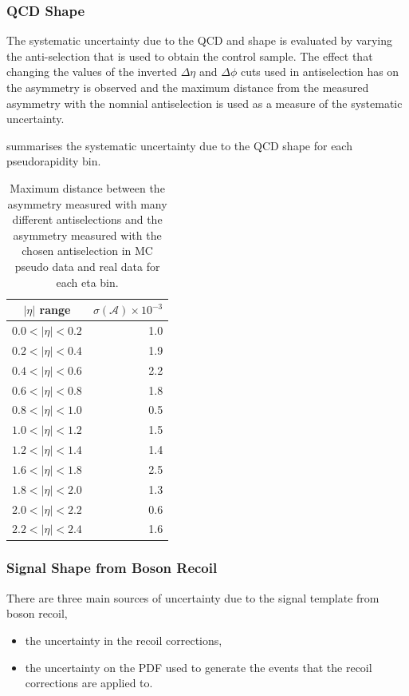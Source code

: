 \subsubsection{QCD \ETm Shape}
The systematic uncertainty due to the \ac{QCD} and \gjet \ETm shape is evaluated
by varying the anti-selection that is used to obtain the control sample. The
effect that changing the values of the inverted $\Delta\eta$ and $\Delta\phi$
cuts used in antiselection has on the asymmetry is observed and the maximum
distance from the measured asymmetry with the nomnial antiselection is used as a
measure of the systematic uncertainty.

 summarises the systematic uncertainty due to the
\ac{QCD} \ETm shape for each pseudorapidity bin.

\begin{table}[htbp]
\begin{center}
\begin{tabular}{cr}
\toprule
$|\eta|$ range  & $\sigma(\mathcal{A}) \times 10^{-3}$\\
\midrule
$0.0<|\eta|<0.2$ & 1.0\\
$0.2<|\eta|<0.4$ & 1.9\\
$0.4<|\eta|<0.6$ & 2.2\\
$0.6<|\eta|<0.8$ & 1.8\\
$0.8<|\eta|<1.0$ & 0.5\\
$1.0<|\eta|<1.2$ & 1.5\\
$1.2<|\eta|<1.4$ & 1.4\\
$1.6<|\eta|<1.8$ & 2.5\\
$1.8<|\eta|<2.0$ & 1.3\\
$2.0<|\eta|<2.2$ & 0.6\\
$2.2<|\eta|<2.4$ & 1.6\\
\bottomrule
\end{tabular}
\caption{Maximum distance between the asymmetry measured with many different antiselections
and the asymmetry measured with the chosen antiselection in MC pseudo data and real data for each eta bin.}
\label{tab:updatedsystQCD}
\end{center}
\end{table}

\subsubsection{Signal \ETm Shape from Boson Recoil}

There are three main sources of uncertainty due to the signal template from
boson recoil,
\begin{itemize}
    \item the uncertainty in the recoil corrections,
    \item the uncertainty on the \ac{PDF} used to generate the events that the
recoil corrections are applied to.
\end{itemize}

